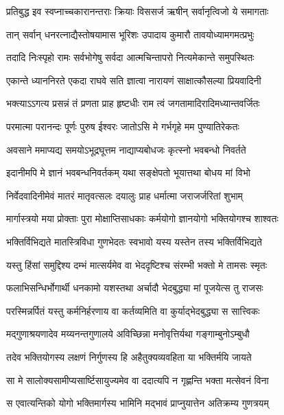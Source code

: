 \twolineshloka
{प्रतिबुद्ध इव स्वप्नाच्चकारानन्तराः क्रियाः}
{विससर्ज ऋषीन् सर्वानृत्विजो ये समागताः} %

\twolineshloka
{तान् सर्वान् धनरत्नाद्यैस्तोषयामास भूरिशः}
{उपादाय कुमारौ तावयोध्यामगमत्प्रभुः} %

\twolineshloka
{तदादि निःस्पृहो रामः सर्वभोगेषु सर्वदा}
{आत्मचिन्तापरो नित्यमेकान्ते समुपस्थितः} %

\twolineshloka
{एकान्ते ध्याननिरते एकदा राघवे सति}
{ज्ञात्वा नारायणं साक्षात्कौसल्या प्रियवादिनी} %

\twolineshloka
{भक्त्याऽऽगत्य प्रसन्नं तं प्रणता प्राह हृष्टधीः}
{राम त्वं जगतामादिरादिमध्यान्तवर्जितः} %

\twolineshloka
{परमात्मा परानन्दः पूर्णः पुरुष ईश्वरः}
{जातोऽसि मे गर्भगृहे मम पुण्यातिरेकतः} %

\twolineshloka
{अवसाने ममाप्यद्य समयोऽभूद्रघूत्तम}
{नाद्याप्यबोधजः कृत्स्नो भवबन्धो निवर्तते} %

\twolineshloka
{इदानीमपि मे ज्ञानं भवबन्धनिवर्तकम्}
{यथा सङ्क्षेपतो भूयात्तथा बोधय मां विभो} %

\twolineshloka
{निर्वेदवादिनीमेवं मातरं मातृवत्सलः}
{दयालुः प्राह धर्मात्मा जराजर्जरितां शुभाम्} %

\twolineshloka
{मार्गास्त्रयो मया प्रोक्ताः पुरा मोक्षाप्तिसाधकाः}
{कर्मयोगो ज्ञानयोगो भक्तियोगश्च शाश्वतः} %

\twolineshloka
{भक्तिर्विभिद्यते मातस्त्रिविधा गुणभेदतः}
{स्वभावो यस्य यस्तेन तस्य भक्तिर्विभिद्यते} %

\twolineshloka
{यस्तु हिंसां समुद्दिश्य दम्भं मात्सर्यमेव वा}
{भेददृष्टिश्च संरम्भी भक्तो मे तामसः स्मृतः} %

\twolineshloka
{फलाभिसन्धिर्भोगार्थी धनकामो यशस्तथा}
{अर्चादौ भेदबुद्ध्या मां पूजयेत्स तु राजसः} %

\twolineshloka
{परस्मिन्नर्पितं यस्तु कर्मनिर्हरणाय वा}
{कर्तव्यमिति वा कुर्याद्भेदबुद्ध्या स सात्त्विकः} %

\twolineshloka
{मद्गुणाश्रयणादेव मय्यनन्तगुणालये}
{अविच्छिन्ना मनोवृत्तिर्यथा गङ्गाम्बुनोऽम्बुधौ} %

\twolineshloka
{तदेव भक्तियोगस्य लक्षणं निर्गुणस्य हि}
{अहैतुक्यव्यवहिता या भक्तिर्मयि जायते} %

\twolineshloka
{सा मे सालोक्यसामीप्यसार्ष्टिसायुज्यमेव वा}
{ददात्यपि न गृह्णन्ति भक्ता मत्सेवनं विना} %

\twolineshloka
{स एवात्यन्तिको योगो भक्तिमार्गस्य भामिनि}
{मद्भावं प्राप्नुयात्तेन अतिक्रम्य गुणत्रयम्} %

